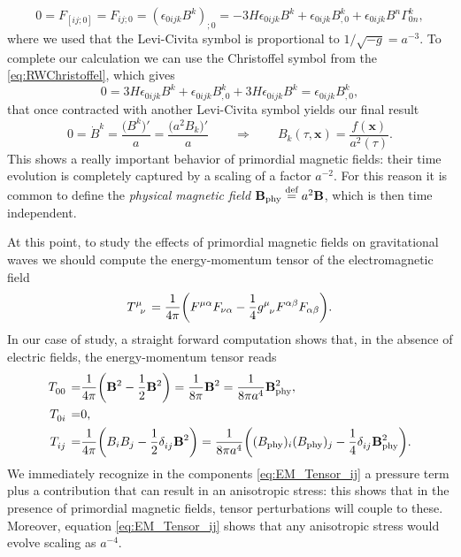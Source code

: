 $$0=F_{[ij;0]}=F_{ij;0}=(\epsilon_{0ijk}B^k)_{;0}=-3H\epsilon_{0ijk}B^k+\epsilon_{0ijk}B^k_{,0}+\epsilon_{0ijk}B^n\Gamma_{0n}^{k},$$
where we used that the Levi-Civita symbol is proportional to $1/\sqrt{-g}=a^{-3}$. To complete our calculation we can use the Christoffel symbol from the \eqref{eq:RWChristoffel}, which gives
$$0=3H\epsilon_{0ijk}B^k+\epsilon_{0ijk}B^k_{,0}+3H\epsilon_{0ijk}B^k=\epsilon_{0ijk}B^k_{,0},$$
that once contracted with another Levi-Civita symbol yields our final result
\begin{equation}
    0=\dot B^k=\frac{\big(B^k\big)'}{a}=\frac{\big(a^2 B_k\big)'}{a}\qquad\Rightarrow\qquad B_k(\tau,\mathbf{x})=\frac{f(\mathbf{x})}{a^2(\tau)}.
\end{equation}
This shows a really important behavior of primordial magnetic fields: their time evolution is completely captured by a scaling of a factor $a^{-2}$. For this reason it is common to define the \emph{physical magnetic field} $\mathbf B_\text{phy}\stackrel{\text{def}}{=} a^2 \mathbf B$, which is then time independent. 

At this point, to study the effects of primordial magnetic fields on gravitational waves we should compute the energy-momentum tensor of the electromagnetic field
$$
\tensor{T}{^\mu_\nu}=\frac{1}{4\pi}\bigg(F^{\mu\alpha}F_{\nu\alpha}-\frac{1}{4}\tensor{g}{^\mu_\nu} F^{\alpha\beta}F_{\alpha\beta}\bigg).
$$
In our case of study, a straight forward computation shows that, in the absence of electric fields, the energy-momentum tensor reads
\begin{subequations}
    \begin{align}
    \tensor{T}{_0_0}=&\frac{1}{4\pi}\bigg(\mathbf B^2-\frac{1}{2}\mathbf B^2\bigg)=\frac{1}{8\pi}\mathbf B^2=\frac{1}{8\pi a^4}\mathbf B^2_\text{phy},\label{eq:EM_Tensor_00}\\
    \tensor{T}{_0_i}=&0\label{eq:EM_Tensor_0i},\\
    \tensor{T}{_i_j}=&\frac{1}{4\pi}\bigg(B_iB_j-\frac{1}{2}\tensor{\delta}{_i_j} \mathbf B^2\bigg)=\frac{1}{8\pi a^4}\bigg((B_\text{phy})_i(B_\text{phy})_j-\frac{1}{4}\tensor{\delta}{_i_j} \mathbf B_\text{phy}^2\bigg).\label{eq:EM_Tensor_ij}
\end{align}
\end{subequations}
We immediately recognize in the components \eqref{eq:EM_Tensor_ij} a pressure term plus a contribution that can result in an anisotropic stress: this shows that in the presence of primordial magnetic fields, tensor perturbations will couple to these. Moreover, equation \eqref{eq:EM_Tensor_ij} shows that any anisotropic stress would evolve scaling as $a^{-4}$. 

